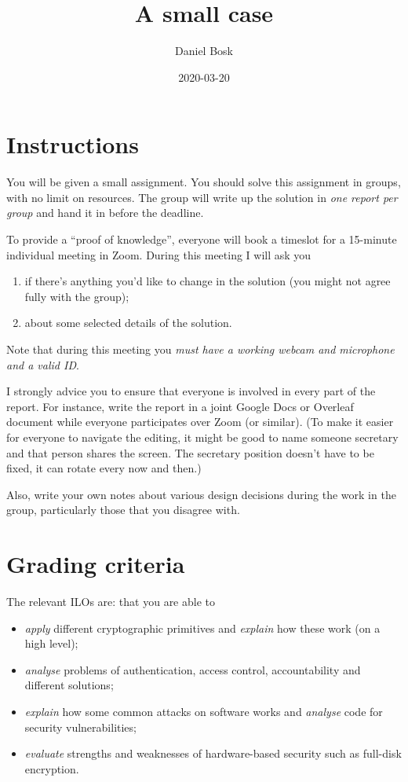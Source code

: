 \documentclass{miunasgn}
\title{A small case}
\date{2020-03-20}
\author{%
  Daniel Bosk
}
\affil{%
  Department of Information Systems and Technology,\\
  Mid Sweden University, SE-851\,70 Sundsvall\\
  Email: \href{mailto:daniel.bosk@miun.se}{daniel.bosk@miun.se}\\
  Phone: 010-142\,8709
}
\begin{document}
\maketitle
\thispagestyle{foot}

\section*{Instructions}%
\label{sec:Instructions}
You will be given a small assignment.
You should solve this assignment in groups, with no limit on resources.
The group will write up the solution in \emph{one report per group} and hand it 
in before the deadline.

To provide a \enquote{proof of knowledge}, everyone will book a timeslot for a 
15-minute individual meeting in Zoom.
During this meeting I will ask you
\begin{enumerate}
  \item if there's anything you'd like to change in the solution (you might not 
    agree fully with the group);
  \item about some selected details of the solution.
\end{enumerate}
Note that during this meeting you \emph{must have a working webcam and 
microphone and a valid ID}.

I strongly advice you to ensure that everyone is involved in every part of the 
report.
For instance, write the report in a joint Google Docs or Overleaf document 
while everyone participates over Zoom (or similar).
(To make it easier for everyone to navigate the editing, it might be good to 
name someone secretary and that person shares the screen.
The secretary position doesn't have to be fixed, it can rotate every now and 
then.)

Also, write your own notes about various design decisions during the work in 
the group, particularly those that you disagree with.


\section*{Grading criteria}

The relevant \acp{ILO} are: that you are able to
\begin{itemize}
  \item \emph{apply} different cryptographic primitives and \emph{explain} how 
    these work (on a high level);

  \item \emph{analyse} problems of authentication, access control, 
    accountability and different solutions;

  \item \emph{explain} how some common attacks on software works and 
    \emph{analyse} code for security vulnerabilities;

  \item \emph{evaluate} strengths and weaknesses of hardware-based security 
    such as full-disk encryption.
\end{itemize}
\end{document}
